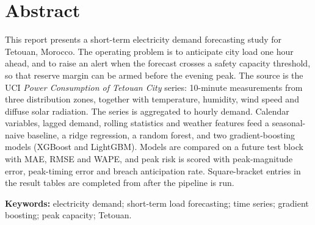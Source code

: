 \section*{Abstract}

This report presents a short-term electricity demand forecasting study for
Tetouan, Morocco. The operating problem is to anticipate city load one hour
ahead, and to raise an alert when the forecast crosses a safety capacity
threshold, so that reserve margin can be armed before the evening peak. The
source is the UCI \emph{Power Consumption of Tetouan City} series: 10-minute
measurements from three distribution zones, together with temperature,
humidity, wind speed and diffuse solar radiation. The series is aggregated to
hourly demand. Calendar variables, lagged demand, rolling statistics and
weather features feed a seasonal-naive baseline, a ridge regression, a random
forest, and two gradient-boosting models (XGBoost and LightGBM). Models are
compared on a future test block with MAE, RMSE and WAPE, and peak risk is
scored with peak-magnitude error, peak-timing error and breach anticipation
rate. Square-bracket entries in the result tables are completed from
 after the pipeline is run.

\noindent\textbf{Keywords:} electricity demand; short-term load forecasting;
time series; gradient boosting; peak capacity; Tetouan.
